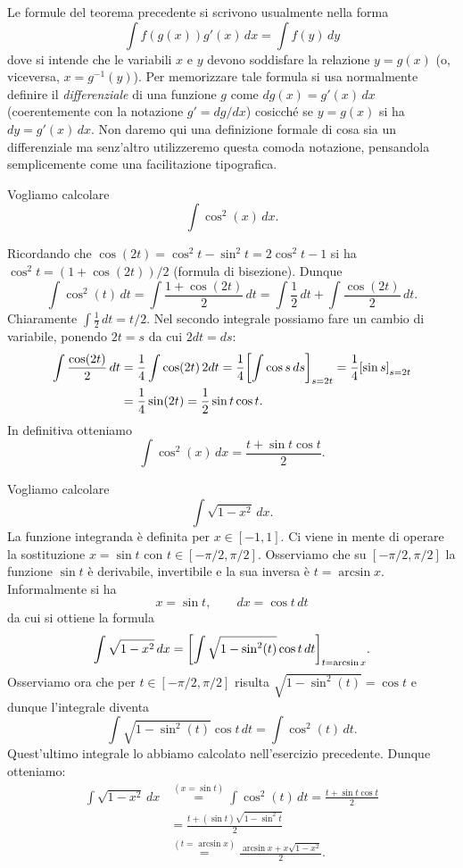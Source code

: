 Le formule del teorema precedente si scrivono usualmente nella forma
\[
  \int f(g(x)) g'(x)\, dx = \int f(y) \, dy
\]
dove si intende che le variabili $x$ e $y$ devono soddisfare la relazione
$y=g(x)$ (o, viceversa, $x=g^{-1}(y)$).
Per memorizzare tale formula si usa normalmente definire il
\emph{differenziale} di una funzione $g$ come $dg(x) = g'(x)\, dx$
(coerentemente con la notazione $g' = dg / dx$)
cosicché se $y=g(x)$ si ha $dy = g'(x)\, dx$.
Non daremo qui una definizione formale di cosa sia un differenziale
ma senz'altro utilizzeremo questa comoda notazione, pensandola
semplicemente come una facilitazione tipografica.

\begin{exercise}
Vogliamo calcolare
\[
  \int \cos^2(x)\, dx.
\]

Ricordando che $\cos(2t) = \cos^2 t - \sin^2 t = 2\cos^2 t - 1$ si
ha $\cos^2 t = (1+\cos(2t))/2$ (formula di bisezione).
Dunque
\[
\int \cos^2(t)\, dt
= \int\frac{1+\cos(2t)}{2}\, dt
= \int \frac 1 2 \, dt + \int \frac{\cos(2t)}{2}\, dt.
\]
Chiaramente $\int \frac 1 2 \, dt  = t/2$.
Nel secondo integrale
possiamo fare un cambio di variabile, ponendo
$2t=s$ da cui $2dt = ds$:
\begin{align*}
\int \frac{\cos(2t)}{2}\, dt
&= \frac 1 4 \int \cos(2t)\, 2dt
= \frac 1 4 {\left[ \int \cos s \, ds \right]}_{s=2t}
= \frac 1 4 {\left[ \sin s \right]}_{s=2t}\\
&= \frac 1 4 \sin(2t)
= \frac{1}{2}\sin t \cos t.
\end{align*}
In definitiva otteniamo
\[
  \int \cos^2(x)\, dx = \frac{t+\sin t \cos t}{2}.
\]
\end{exercise}


\begin{example}
Vogliamo calcolare
\[
 \int \sqrt{1-x^2}\, dx.
\]
La funzione integranda è definita per $x\in [-1,1]$.
Ci viene in mente di operare la sostituzione $x=\sin t$
con $t\in [-\pi/2, \pi/2]$.
Osserviamo che su $[-\pi/2,\pi/2]$ la funzione $\sin t$ è derivabile,
invertibile e la sua inversa è $t = \arcsin x$.
Informalmente si ha
\[
 x= \sin t, \qquad dx = \cos t \, dt
\]
da cui si ottiene la formula
\[
 \int \sqrt{1-x^2}\, dx = {\left[ \int \sqrt{1-\sin^2(t)} \cos t\, dt \right]}_{t=\arcsin x}.
\]
Osserviamo ora che per $t\in [-\pi/2, \pi/2]$ risulta $\sqrt{1-\sin^2(t)}=\cos t$
e dunque l'integrale
diventa
\[
 \int \sqrt{1-\sin^2(t)}\cos t\, dt = \int \cos^2(t)\, dt.
\]
Quest'ultimo integrale lo abbiamo calcolato nell'esercizio precedente.
Dunque otteniamo:
\begin{align*}
 \int \sqrt{1-x^2}\, dx
 &\stackrel{(x=\sin t)}= \int \cos^2(t)\, dt
 = \frac{t + \sin t \cos t}{2} \\
 &= \frac{t + (\sin t) \sqrt{1-\sin^2 t}}{2} \\
 &\stackrel{(t=\arcsin x)}= \frac{\arcsin x + x \sqrt{1-x^2}}{2}.
\end{align*}
\end{example}

